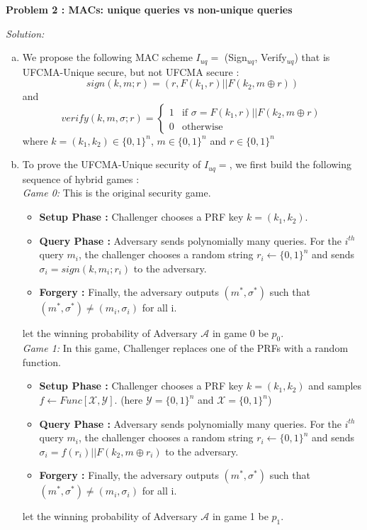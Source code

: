 \documentclass[a4paper, 11pt]{article}
\newenvironment{solution}
    {\textit{Solution:}}
    {\clearpage}
\newcommand{\prob}[1]{\begin{mdframed}[backgroundcolor=gray!20] \textbf{Problem #1}\end{mdframed}}
\newcommand{\calA}{\mathcal{A}}
\newcommand{\calX}{\mathcal{X}}
\newcommand{\calY}{\mathcal{Y}}
\begin{document}
\prob{2 : MACs: unique queries vs non-unique queries}
\begin{solution}
    \begin{enumerate}[(a)]
    \item We propose the following MAC scheme $I_{uq} =$ (Sign$_{uq}$, Verify$_{uq}$) that is UFCMA-Unique secure, but not UFCMA secure :
    $$sign(k, m; r) = (r, F(k_1, r) || F(k_2, m \oplus r))$$ and 
    $$verify(k, m, \sigma; r) = \begin{cases}
        1 & \text{if } \sigma = F(k_1, r) || F(k_2, m \oplus r) \\
        0 & \text{otherwise}
    \end{cases}$$
    where $k = (k_1, k_2) \in \{0, 1\}^n$, $m \in \{0, 1\}^n$ and $r \in \{0, 1\}^n$

    \item To prove the UFCMA-Unique security of $I_{uq} =$, we first build the following sequence of hybrid games : \\

    \textit{Game 0:} This is the original security game.
    \begin{itemize}
        \item \textbf{Setup Phase :} Challenger chooses a PRF key $k = (k_1, k_2)$.
        \item \textbf{Query Phase :} Adversary sends polynomially many queries. For the $i^{th}$ query $m_i$, the challenger chooses a random string $r_i \leftarrow \{0, 1\}^n$ and sends $\sigma_i = sign(k, m_i ; r_i)$ to the adversary.
        \item \textbf{Forgery :} Finally, the adversary outputs $(m^*, \sigma^*)$ such that $(m^*, \sigma^*) \neq (m_i, \sigma_i)$ for all i.
    \end{itemize}
    let the winning probability of Adversary $\calA$ in game 0 be $p_0$. \\

    \textit{Game 1:} In this game, Challenger replaces one of the PRFs with a random function.
    \begin{itemize}
        \item \textbf{Setup Phase :} Challenger chooses a PRF key $k = (k_1, k_2)$ and samples $f \leftarrow Func[\calX, \calY]$. (here $\calY = \{0, 1\}^n$ and $\calX = \{0, 1\}^n$)
        \item \textbf{Query Phase :} Adversary sends polynomially many queries. For the $i^{th}$ query $m_i$, the challenger chooses a random string $r_i \leftarrow \{0, 1\}^n$ and sends $\sigma_i = f(r_i) || F(k_2, m \oplus r_i)$ to the adversary.
        \item \textbf{Forgery :} Finally, the adversary outputs $(m^*, \sigma^*)$ such that $(m^*, \sigma^*) \neq (m_i, \sigma_i)$ for all i.
    \end{itemize}
    let the winning probability of Adversary $\calA$ in game 1 be $p_1$. \\


\end{enumerate}
\end{solution}
\end{document}
